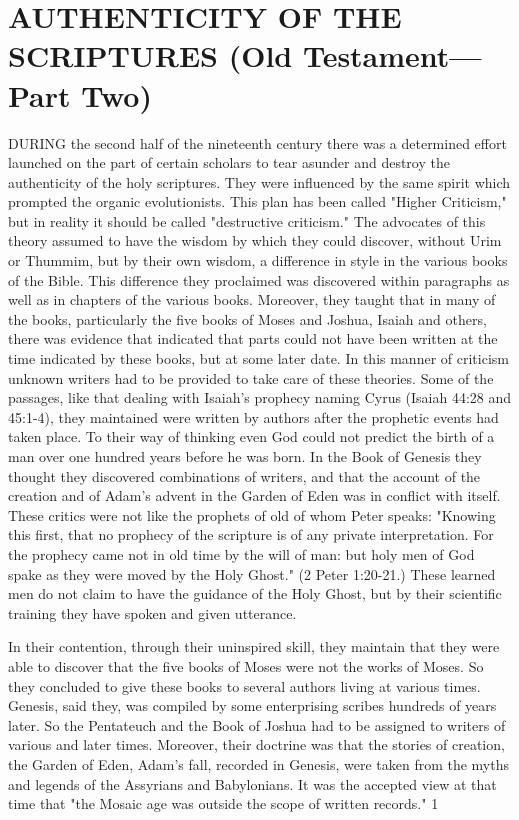 \chapter{AUTHENTICITY OF THE SCRIPTURES (Old Testament—Part Two)}

DURING the second half of the nineteenth century there was a determined effort launched on
the part of certain scholars to tear asunder and destroy the authenticity of the holy scriptures.
They were influenced by the same spirit which prompted the organic evolutionists. This plan
has been called "Higher Criticism," but in reality it should be called "destructive criticism."
The advocates of this theory assumed to have the wisdom by which they could discover,
without Urim or Thummim, but by their own wisdom, a difference in style in the various
books of the Bible. This difference they proclaimed was discovered within paragraphs as
well as in chapters of the various books. Moreover, they taught that in many of the books,
particularly the five books of Moses and Joshua, Isaiah and others, there was evidence that
indicated that parts could not have been written at the time indicated by these books, but at
some later date. In this manner of criticism unknown writers had to be provided to take care
of these theories. Some of the passages, like that dealing with Isaiah's prophecy naming
Cyrus (Isaiah 44:28 and 45:1-4), they maintained were written by authors after the prophetic
events had taken place. To their way of thinking even God could not predict the birth of a
man over one hundred years before he was born. In the Book of Genesis they thought they
discovered combinations of writers, and that the account of the creation and of Adam's
advent in the Garden of Eden was in conflict with itself. These critics were not like the
prophets of old of whom Peter speaks: "Knowing this first, that no prophecy of the scripture
is of any private interpretation. For the prophecy came not in old time by the will of man: but
holy men of God spake as they were moved by the Holy Ghost." (2 Peter 1:20-21.) These
learned men do not claim to have the guidance of the Holy Ghost, but by their scientific
training they have spoken and given utterance.

In their contention, through their uninspired skill, they maintain that they were able to
discover that the five books of Moses were not the works of Moses. So they concluded to
give these books to several authors living at various times. Genesis, said they, was compiled
by some enterprising scribes hundreds of years later. So the Pentateuch and the Book of
Joshua had to be assigned to writers of various and later times. Moreover, their doctrine was
that the stories of creation, the Garden of Eden, Adam's fall, recorded in Genesis, were taken
from the myths and legends of the Assyrians and Babylonians. It was the accepted view at
that time that "the Mosaic age was outside the scope of written records." 1

